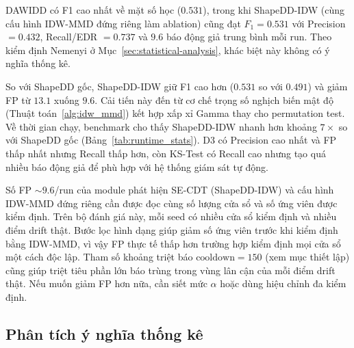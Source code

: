 \begin{table}[H]
	\centering
	\caption[So sánh tổng hợp hiệu suất các phương pháp phát hiện drift]{So sánh tổng hợp hiệu suất các phương pháp phát hiện drift. \textit{Lưu ý:} ShapeDD-IDW là module phát hiện của SE-CDT; SE-CDT là toàn bộ hệ thống (bao gồm cả module phân loại). Ở benchmark phát hiện này, hai dòng dùng cùng thuật toán nên F1, Precision, Recall, FP trùng nhau theo thiết kế.}
	\label{tab:comprehensive_performance}
	
\end{table}

DAWIDD có F1 cao nhất về mặt số học ($0.531$), trong khi ShapeDD-IDW (cùng cấu hình IDW-MMD đứng riêng làm ablation) cũng đạt $F_1 = 0.531$ với Precision $=0.432$, Recall/EDR $=0.737$ và $9.6$ báo động giả trung bình mỗi run. Theo kiểm định Nemenyi ở Mục~\ref{sec:statistical-analysis}, khác biệt này không có ý nghĩa thống kê.

So với ShapeDD gốc, ShapeDD-IDW giữ F1 cao hơn ($0.531$ so với $0.491$) và giảm FP từ $13.1$ xuống $9.6$. Cải tiến này đến từ cơ chế trọng số nghịch biến mật độ (Thuật toán~\ref{alg:idw_mmd}) kết hợp xấp xỉ Gamma thay cho permutation test. Về thời gian chạy, benchmark cho thấy ShapeDD-IDW nhanh hơn khoảng $7\times$ so với ShapeDD gốc (Bảng~\ref{tab:runtime_stats}). D3 có Precision cao nhất và FP thấp nhất nhưng Recall thấp hơn, còn KS-Test có Recall cao nhưng tạo quá nhiều báo động giả để phù hợp với hệ thống giám sát tự động.

Số FP $\sim 9.6$/run của module phát hiện SE-CDT (ShapeDD-IDW) và cấu hình IDW-MMD đứng riêng cần được đọc cùng số lượng cửa sổ và số ứng viên được kiểm định. Trên bộ đánh giá này, mỗi seed có nhiều cửa sổ kiểm định và nhiều điểm drift thật. Bước lọc hình dạng giúp giảm số ứng viên trước khi kiểm định bằng IDW-MMD, vì vậy FP thực tế thấp hơn trường hợp kiểm định mọi cửa sổ một cách độc lập. Tham số khoảng triệt báo $\text{cooldown}=150$ (xem mục thiết lập) cũng giúp triệt tiêu phần lớn báo trùng trong vùng lân cận của mỗi điểm drift thật. Nếu muốn giảm FP hơn nữa, cần siết mức $\alpha$ hoặc dùng hiệu chỉnh đa kiểm định.

\subsection{Phân tích ý nghĩa thống kê}

